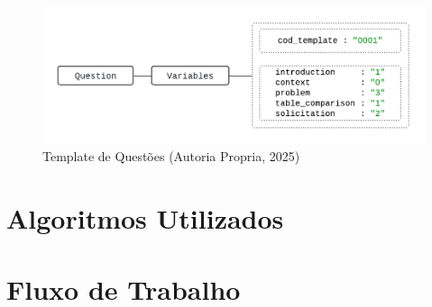 \begin{figure}[ht]
	\centering
	\includegraphics[width=14cm]{./imagens/capitulo5/template-2}
	\caption{Template de Questões (Autoria Propria, 2025) }
	\label{fig:template-2}
\end{figure}

\section{Algoritmos Utilizados}

\section{Fluxo de Trabalho}
